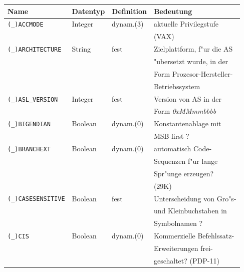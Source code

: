 \documentclass[12pt,a4paper,twoside]{report}
\newcommand{\asname}{AS}
\newcommand{\predefsym}[1]{{\tt (\_)#1}}
\begin{document}
\begin{center}\begin{longtable}{|l|l|l|l|}
\hline
Name                   &  Datentyp   & Definition & Bedeutung \\
\hline\hline
\endhead
\predefsym{ACCMODE}    &  Integer    & dynam.(3)  & aktuelle Privilegstufe \\
                       &             &            & (VAX) \\
\hline
\predefsym{ARCHITECTURE} & String    & fest       & Zielplattform, f"ur die \asname{} \\
                       &             &            & "ubersetzt wurde, in der \\
                       &             &            & Form Prozesor-Hersteller- \\
                       &             &            & Betriebssystem \\
\hline
\predefsym{ASL\_VERSION} & Integer   & fest       & Version von \asname{} in der \\
                       &             &            & Form {\em 0xMMmmbbbb} \\
\hline
\predefsym{BIGENDIAN}  &  Boolean    & dynam.(0)  & Konstantenablage mit \\
                       &             &            & MSB-first ? \\
\hline
\predefsym{BRANCHEXT}  &  Boolean    & dynam.(0)  & automatisch Code- \\
                       &             &            & Sequenzen f"ur lange \\
                       &             &            & Spr"unge erzeugen? \\
                       &             &            & (29K) \\
\hline
\predefsym{CASESENSITIVE} & Boolean  & fest       & Unterscheidung von Gro"s- \\
                       &             &            & und Kleinbuchstaben in \\
                       &             &            & Symbolnamen ? \\
\hline
\predefsym{CIS}        &  Boolean    & dynam.(0)  & Kommerzielle Befehlssatz- \\
                       &             &            & Erweiterungen frei- \\
                       &             &            & geschaltet? (PDP-11) \\

\end{longtable}
\end{center}
\end{document}
